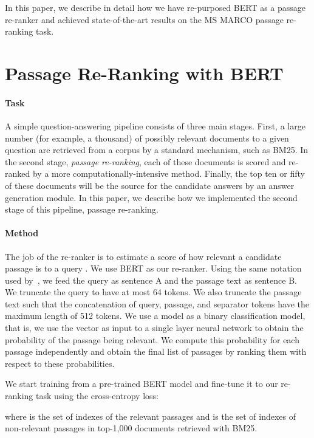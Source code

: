 \documentclass{article} \usepackage{iclr2019_conference}
\begin{document}
In this paper, we describe in detail how we have re-purposed BERT as a passage re-ranker and achieved state-of-the-art results on the MS MARCO passage re-ranking task.

\section{Passage Re-Ranking with BERT}

\paragraph{Task}

A simple question-answering pipeline consists of three main stages. First, a large number (for example, a thousand) of possibly relevant documents to a given question are retrieved from a corpus by a standard mechanism, such as BM25. In the second stage, \textit{passage re-ranking}, each of these documents is scored and re-ranked by a more computationally-intensive method. Finally, the top ten or fifty of these documents will be the source for the candidate answers by an answer generation module. 
In this paper, we describe how we implemented the second stage of this pipeline, passage re-ranking.

\paragraph{Method}


The job of the re-ranker is to estimate a score  of how relevant a candidate passage  is to a query .
We use BERT as our re-ranker. Using the same notation used by~\citet{devlin2018bert}, we feed the query as sentence A and the passage text as sentence B. We truncate the query to have at most 64 tokens. We also truncate the passage text such that the concatenation of query, passage, and separator tokens have the maximum length of 512 tokens. We use a  model as a binary classification model, that is, we use the  vector as input to a single layer neural network to obtain the probability of the passage being relevant. We compute this probability for each passage independently and obtain the final list of passages by ranking them with respect to these probabilities. 

We start training from a pre-trained BERT model and fine-tune it to our re-ranking task using the cross-entropy loss: 

where  is the set of indexes of the relevant passages and  is the set of indexes of non-relevant passages in top-1,000 documents retrieved with BM25. 
\end{document}
